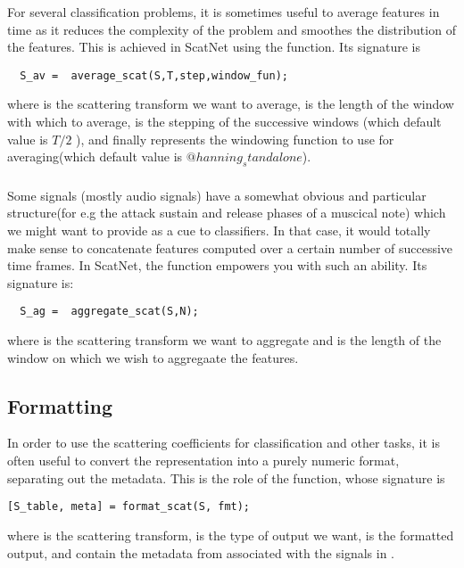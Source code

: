 \documentclass{article}
\begin{document}
\subsubsection{}

For several classification problems, it is sometimes useful to average features in time as it reduces the complexity of the problem and smoothes the distribution of the features.
This is achieved in ScatNet using the  function. Its signature is 

\begin{lstlisting}
  S_av =  average_scat(S,T,step,window_fun);
\end{lstlisting}
where  is the scattering transform we want to average,  is the length of the window with which to average,  is the stepping of the successive 
windows (which default value is $T/2$ ), and finally  represents the windowing function to use for averaging(which default value is $@hanning_standalone$). 

\subsubsection{}

 Some signals (mostly audio signals) have a somewhat obvious and particular structure(for e.g the attack sustain and release phases of a muscical note) which we might want 
to provide as a cue to classifiers. In that case, it would totally make sense to concatenate features computed over a certain number of successive time frames. In ScatNet,
the function  empowers you with such an ability. Its  signature is:

\begin{lstlisting}
  S_ag =  aggregate_scat(S,N);
\end{lstlisting}
where  is the scattering transform we want to aggregate and  is the length of the window on which we wish to aggregaate the features.

\subsection{Formatting}

In order to use the scattering coefficients for classification and other tasks, it is often useful to convert the representation into a purely numeric format, separating 
out the metadata. This is the role of the  function, whose signature is
\begin{lstlisting}
[S_table, meta] = format_scat(S, fmt);
\end{lstlisting}
where  is the scattering transform,  is the type of output we want,  is the formatted output, and  contain the metadata 
from  associated with the signals in .
\end{document}
